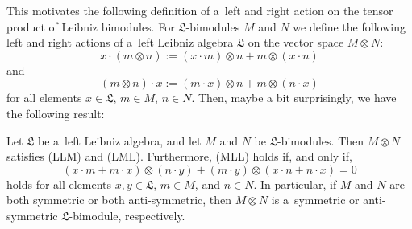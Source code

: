 \documentclass{jonasart}
\newcommand{\lf}{\mathfrak{L}}
\begin{document}
	This motivates the following definition of a~left and right action on the tensor product of Leibniz bimodules. For $\lf$-bimodules
	$M$ and $N$ we define the following left and right actions of a~left
	Leibniz algebra $\lf$ on the vector space $M\otimes N$:
	\[
		x\cdot(m\otimes n):=(x\cdot m)\otimes n+m\otimes(x\cdot n)
	\]
	and
	\[
		(m\otimes n)\cdot x:=(m\cdot x)\otimes n+m\otimes(n\cdot x)
	\]
	for all elements $x\in\lf$, $m\in M$, $n\in N$. Then, maybe a bit surprisingly, we have the following result:
	\begin{proposition}\label{tensprod}
		Let $\lf$ be a~left Leibniz algebra, and let $M$ and $N$ be $\lf$-bimodules. Then $M\otimes N$ satisfies \textup{(LLM)} and \textup{(LML)}. Furthermore,
		\textup{(MLL)} holds if, and only if,
		\begin{equation}\label{*}
			(x\cdot m+m\cdot x)\otimes (n\cdot y)+(m\cdot y)\otimes
			(x\cdot n+n\cdot x)=0
		\end{equation}
		holds for all elements $x,y\in\lf$, $m\in M$, and $n\in N$. In particular, if $M$ and $N$ are both symmetric or both anti-symmetric, then $M\otimes N$ is a~symmetric or anti-symmetric $\lf$-bimodule, respectively.
	\end{proposition}
\end{document}
